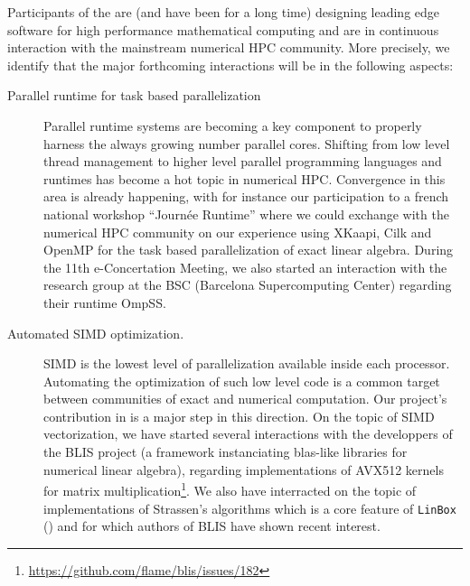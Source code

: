 Participants of the  are (and have been for a long time) designing
leading edge software for high performance mathematical computing and are in
continuous interaction with the mainstream numerical HPC community.
More precisely, we identify that the major forthcoming interactions will be in
the following aspects:
\begin{description}
\item[Parallel runtime for task based parallelization] Parallel runtime systems
  are becoming a key component to properly harness the always growing number
  parallel cores. Shifting from low level thread management to higher level
  parallel programming languages and runtimes has become a hot topic in numerical
  HPC. Convergence in this area is already happening, with for instance our
  participation to a french national workshop ``Journée Runtime'' where we could exchange with the
  numerical HPC community on our experience using XKaapi, Cilk and OpenMP for the task
  based parallelization of exact linear algebra. During the 11th e-Concertation
  Meeting, we also started an interaction with the research group at the BSC
  (Barcelona Supercomputing Center) regarding their runtime OmpSS.
\item[Automated SIMD optimization.] SIMD is the lowest level of parallelization
  available inside each processor. Automating the optimization of such low level code is a common target
  between communities of exact and numerical computation. 
  Our project's contribution in   is a major
  step in this direction.
  On the topic of SIMD vectorization, we have started several interactions with the developpers of the BLIS project
  (a framework instanciating blas-like libraries for numerical linear algebra),
  regarding implementations of AVX512 kernels for matrix multiplication\footnote{\url{https://github.com/flame/blis/issues/182}}. We also
  have interracted on the topic of implementations of Strassen's algorithms
  which is a core feature of \texttt{LinBox} () and for which authors of BLIS have shown recent interest.
  
\end{description}






